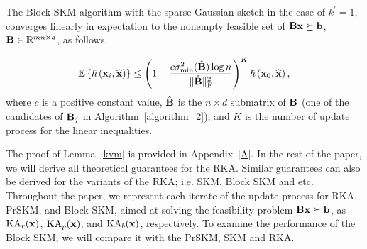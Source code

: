 \documentclass[12pt,draftcls,onecolumn]{IEEEtran}
\begin{document}

\begin{lemma}
\label{kvm}
The Block SKM algorithm with the sparse Gaussian sketch in the case of $k^{\prime}=1$, 
converges linearly in expectation to the nonempty feasible set of $\mathbf{B}\mathbf{x}\succeq \mathbf{b}$, $\mathbf{B}\in\mathbb{R}^{m n\times d}$, as follows,

\begin{equation}
\begin{aligned}
\mathbb{E}\left\{\hbar\left(\mathbf{x}_{i},\widehat{\mathbf{x}}\right)\right\}\leq \left(1-\frac{c \sigma_{\min }^2(\hat{\mathbf{B}})\log n}{\|\hat{\mathbf{B}}\|_{\mathrm{F}}^2}\right)^{K}\hbar\left(\mathbf{x}_{0},\widehat{\mathbf{x}}\right),
\end{aligned}
\end{equation}\normalsize
where $c$ is a positive constant value, $\hat{\mathbf{B}}$ is the $n\times d$ submatrix of $\mathbf{B}$ (one of the candidates of $\mathbf{B}_{j}$ in Algorithm~\ref{algorithm_2}), and $K$ is the number of update process for the linear inequalities.
\end{lemma}
The proof of Lemma~\ref{kvm} is provided in Appendix~\ref{A}.
In the rest of the paper, we will derive all theoretical guarantees for the RKA. Similar guarantees can also be derived for the variants of the RKA; i.e. SKM, Block SKM and etc.
Throughout the paper, we represent each iterate of the update process for RKA, PrSKM, and Block SKM, aimed at solving the feasibility problem $\mathbf{B}\mathbf{x}\succeq\mathbf{b}$, as $\mathrm{KA}_{r}(\mathbf{x})$, $\mathrm{KA}_{p}(\mathbf{x})$, and $\mathrm{KA}_{b}(\mathbf{x})$, respectively. To examine the performance of the Block SKM, we will compare it with the PrSKM, SKM and RKA.
\end{document}
